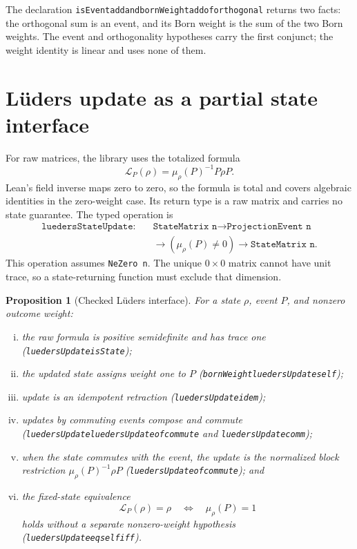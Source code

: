 \documentclass[11pt]{article}
\renewcommand{\_}{\textunderscore\allowbreak}
\newtheorem{proposition}{Proposition}
\theoremstyle{remark}
\newcommand{\lued}{\mathcal L}
\begin{document}
The declaration
\texttt{isEvent\_add\_and\_bornWeight\_add\_of\_orthogonal} returns two facts:
the orthogonal sum is an event, and its Born weight is the sum of the two Born
weights. The event and orthogonality hypotheses carry the first conjunct; the
weight identity is linear and uses none of them.

\section{L\"uders update as a partial state interface}
\label{sec:lueders}

For raw matrices, the library uses the totalized formula
\[
 \lued_P(\rho)=\mu_\rho(P)^{-1}P\rho P.
\]
Lean's field inverse maps zero to zero, so the formula is total and covers
algebraic identities in the zero-weight case. Its return type is a raw matrix
and carries no state guarantee. The typed operation is
\[
\begin{aligned}
\texttt{luedersStateUpdate}:\quad&
 \texttt{StateMatrix n}\to\texttt{ProjectionEvent n}\\
 &\to(\mu_\rho(P)\ne0)\to\texttt{StateMatrix n}.
\end{aligned}
\]
This operation assumes \texttt{NeZero n}. The unique $0\times0$ matrix cannot
have unit trace, so a state-returning function must exclude that dimension.

\begin{proposition}[Checked L\"uders interface]
\label{prop:lueders}
For a state $\rho$, event $P$, and nonzero outcome weight:
\begin{enumerate}[(i)]
\item the raw formula is positive semidefinite and has trace one
(\texttt{luedersUpdate\_isState});
\item the updated state assigns weight one to $P$
(\texttt{bornWeight\_luedersUpdate\_self});
\item update is an idempotent retraction
(\texttt{luedersUpdate\_idem});
\item updates by commuting events compose and commute
(\texttt{luedersUpdate\_luedersUpdate\_of\_commute} and
\texttt{luedersUpdate\_comm});
\item when the state commutes with the event, the update is the normalized
block restriction $\mu_\rho(P)^{-1}\rho P$
(\texttt{luedersUpdate\_of\_commute}); and
\item the fixed-state equivalence
\[
  \lued_P(\rho)=\rho \quad\Longleftrightarrow\quad \mu_\rho(P)=1
\]
holds without a separate nonzero-weight hypothesis
(\texttt{luedersUpdate\_eq\_self\_iff}).
\end{enumerate}
\end{proposition}
\end{document}
